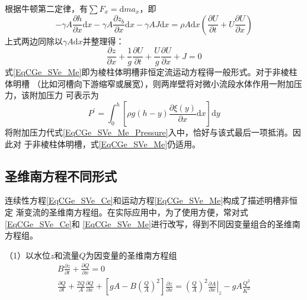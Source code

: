 根据牛顿第二定律，有$\sum F_{x}=\mathrm{d}ma_{x}$，即
\begin{equation}
  -\gamma A\frac{\partial h}{\partial x}\mathrm{d}x
  -\gamma A\frac{\partial z_{b}}{\partial x}\mathrm{d}x
  -\gamma AJ\mathrm{d}x
  =
  \rho A\mathrm{d}x
  \left(
  \frac{\partial U}{\partial t}
  +
  U
  \frac{\partial U}{\partial x}
  \right)
\end{equation}
上式两边同除以$\gamma A\mathrm{d}x$并整理得：
\begin{equation}
  \frac{\partial z}{\partial x}
  +
  \frac{1}{g}
  \frac{\partial U}{\partial t}
  +
  \frac{U}{g}
  \frac{\partial U}{\partial x}
  +
  J
  =
  0
  \label{EqCGe_SVe_Me}
\end{equation}
式\eqref{EqCGe_SVe_Me}即为棱柱体明槽非恒定流运动方程得一般形式。对于非棱柱体明槽
（比如河槽向下游缩窄或展宽），则两岸壁将对微小流段水体作用一附加压力，该附加压力
可表示为
\begin{equation}
  P^{\prime}
  =
  \int_{0}^{h}\!
  \left[
    \rho g(h-y)
    \frac{\partial \xi(y)}{\partial x}
    \mathrm{d}x
  \right]
  \mathrm{d}y
\end{equation}
将附加压力代式\eqref{EqCGe_SVe_Me_Pressure}入中，恰好与该式最后一项抵消。因此对
于非棱柱体明槽，式\eqref{EqCGe_SVe_Me}仍适用。

\subsection{圣维南方程不同形式}
连续性方程\eqref{EqCGe_SVe_Ce}和运动方程\eqref{EqCGe_SVe_Me}构成了描述明槽非恒定
渐变流的圣维南方程组。在实际应用中，为了使用方便，常对式\eqref{EqCGe_SVe_Ce}和
\eqref{EqCGe_SVe_Me}进行改写，得到不同因变量组合的圣维南方程组。


（1）以水位$z$和流量$Q$为因变量的圣维南方程组
\begin{equation}
  \begin{gathered}
    B\frac{\partial z}{\partial t}
    +
    \frac{\partial Q}{\partial x}
    =
    0
    \\
    \frac{\partial Q}{\partial t}
    +
    \frac{2Q}{A}\frac{\partial Q}{\partial x}
    +
    \left[
      gA -
      B
      \left(
      \frac{Q}{A}
      \right)^{2}
    \right]
    \frac{\partial z}{\partial x}
    =
    \left(
    \frac{Q}{A}
    \right)^{2}
    \left.
    \frac{\partial A}{\partial x}
    \right|_{z}
    -
    gA\frac{Q^{2}}{K^{2}}
  \end{gathered}
  \label{EqCGe_SV_zQ}
\end{equation}

